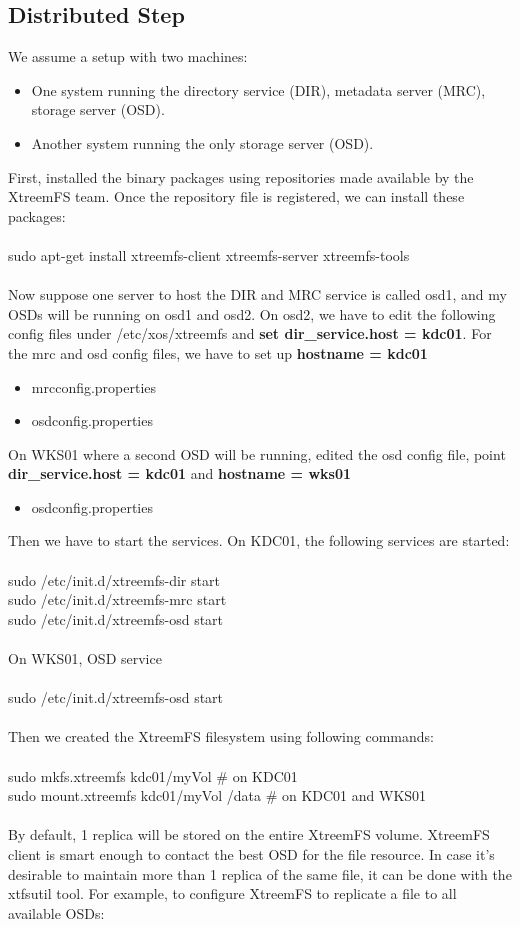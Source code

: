 \documentclass[12pt]{report}
\begin{document}
\subsection{Distributed Step}
We assume a setup with two machines:
\begin{itemize}
\item One system running the directory service (DIR), metadata server (MRC), storage server (OSD).
\item Another system running the only storage server (OSD).
\end{itemize}
First, installed the binary packages using repositories made available by the XtreemFS team. Once the repository file is registered, we can install these packages:\\
\\
sudo apt-get install xtreemfs-client xtreemfs-server xtreemfs-tools\\
\\
Now suppose one server to host the DIR and MRC service is called osd1, and my OSDs will be running on osd1 and osd2. On osd2, we have to edit the following config files under /etc/xos/xtreemfs and \textbf{set dir\_service.host = kdc01}. For the mrc and osd config files, we have to set up \textbf{hostname = kdc01}
\begin{itemize}
\item mrcconfig.properties
\item osdconfig.properties
\end{itemize}
On WKS01 where a second OSD will be running, edited the osd config file, point \textbf{dir\_service.host = kdc01} and \textbf{hostname = wks01}
\begin{itemize}
\item osdconfig.properties
\end{itemize}
Then we have to start the services. On KDC01, the following services are started:\\
\\
sudo /etc/init.d/xtreemfs-dir start\\
sudo /etc/init.d/xtreemfs-mrc start\\
sudo /etc/init.d/xtreemfs-osd start\\
\\
On WKS01, OSD service \\
\\
sudo /etc/init.d/xtreemfs-osd start\\
\\
Then we created the XtreemFS filesystem using following commands:\\
\\
sudo mkfs.xtreemfs kdc01/myVol \# on KDC01\\
sudo mount.xtreemfs kdc01/myVol /data \# on KDC01 and WKS01\\
\\
By default, 1 replica will be stored on the entire XtreemFS volume. XtreemFS client is smart enough to contact the best OSD for the file resource. In case it’s desirable to maintain more than 1 replica of the same file, it can be done with the xtfsutil tool. For example, to configure XtreemFS to replicate a file to all available OSDs:\\
\end{document}
